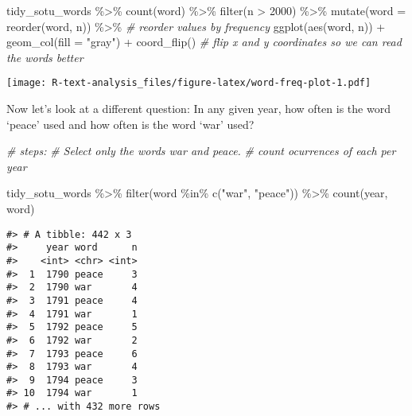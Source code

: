 \documentclass[
]{book}
\newenvironment{Shaded}{\begin{snugshade}}{\end{snugshade}}
\newcommand{\AttributeTok}[1]{\textcolor[rgb]{0.77,0.63,0.00}{#1}}
\newcommand{\CommentTok}[1]{\textcolor[rgb]{0.56,0.35,0.01}{\textit{#1}}}
\newcommand{\DecValTok}[1]{\textcolor[rgb]{0.00,0.00,0.81}{#1}}
\newcommand{\FunctionTok}[1]{\textcolor[rgb]{0.00,0.00,0.00}{#1}}
\newcommand{\NormalTok}[1]{#1}
\newcommand{\SpecialCharTok}[1]{\textcolor[rgb]{0.00,0.00,0.00}{#1}}
\newcommand{\StringTok}[1]{\textcolor[rgb]{0.31,0.60,0.02}{#1}}
\begin{document}
\begin{Shaded}
\begin{Highlighting}[]
\NormalTok{tidy\_sotu\_words }\SpecialCharTok{\%\textgreater{}\%}
  \FunctionTok{count}\NormalTok{(word) }\SpecialCharTok{\%\textgreater{}\%} 
  \FunctionTok{filter}\NormalTok{(n }\SpecialCharTok{\textgreater{}} \DecValTok{2000}\NormalTok{) }\SpecialCharTok{\%\textgreater{}\%} 
  \FunctionTok{mutate}\NormalTok{(}\AttributeTok{word =} \FunctionTok{reorder}\NormalTok{(word, n)) }\SpecialCharTok{\%\textgreater{}\%}  \CommentTok{\# reorder values by frequency}
  \FunctionTok{ggplot}\NormalTok{(}\FunctionTok{aes}\NormalTok{(word, n)) }\SpecialCharTok{+}
     \FunctionTok{geom\_col}\NormalTok{(}\AttributeTok{fill =} \StringTok{"gray"}\NormalTok{) }\SpecialCharTok{+}
     \FunctionTok{coord\_flip}\NormalTok{()  }\CommentTok{\# flip x and y coordinates so we can read the words better}
\end{Highlighting}
\end{Shaded}

\texttt{[image: R-text-analysis\_files/figure-latex/word-freq-plot-1.pdf]}

Now let's look at a different question: In any given year, how often is the word `peace' used and how often is the word `war' used?

\begin{Shaded}
\begin{Highlighting}[]
\CommentTok{\# steps:}
\CommentTok{\# Select only the words \textquotesingle{}war\textquotesingle{} and \textquotesingle{}peace\textquotesingle{}.}
\CommentTok{\# count ocurrences of each per year}

\NormalTok{tidy\_sotu\_words }\SpecialCharTok{\%\textgreater{}\%}
  \FunctionTok{filter}\NormalTok{(word }\SpecialCharTok{\%in\%} \FunctionTok{c}\NormalTok{(}\StringTok{"war"}\NormalTok{, }\StringTok{"peace"}\NormalTok{)) }\SpecialCharTok{\%\textgreater{}\%} 
  \FunctionTok{count}\NormalTok{(year, word)}
\end{Highlighting}
\end{Shaded}

\begin{verbatim}
#> # A tibble: 442 x 3
#>     year word      n
#>    <int> <chr> <int>
#>  1  1790 peace     3
#>  2  1790 war       4
#>  3  1791 peace     4
#>  4  1791 war       1
#>  5  1792 peace     5
#>  6  1792 war       2
#>  7  1793 peace     6
#>  8  1793 war       4
#>  9  1794 peace     3
#> 10  1794 war       1
#> # ... with 432 more rows
\end{verbatim}
\end{document}
